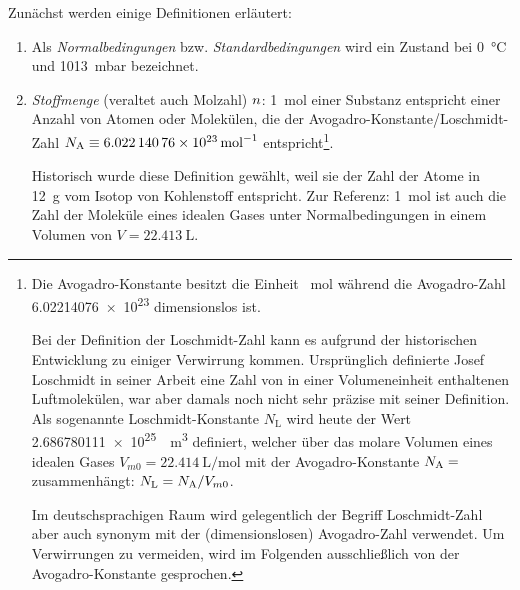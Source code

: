 Zunächst werden einige Definitionen erläutert:
\begin{enumerate}
    \item Als \emph{Normalbedingungen} bzw. \emph{Standardbedingungen} wird ein Zustand bei \SI{0}{\degreeCelsius} und \SI{1013}{\milli\bar} bezeichnet.
    \item \emph{Stoffmenge} (veraltet auch Molzahl) $n$: \SI{1}{\mole} einer Substanz entspricht einer Anzahl von Atomen oder Molekülen, die der Avogadro-Konstante/Loschmidt-Zahl $N_\mathrm{A} \equiv \SI{6,02214076e23}{\per\mole}$ entspricht\footnote{
          Die Avogadro-Konstante besitzt die Einheit \si{\per\mole} während die Avogadro-Zahl \num{6,02214076e23} dimensionslos ist.

          Bei der Definition der Loschmidt-Zahl kann es aufgrund der historischen Entwicklung zu einiger Verwirrung kommen. Ursprünglich definierte Josef Loschmidt in seiner Arbeit  eine Zahl von in einer Volumeneinheit enthaltenen Luftmolekülen, war aber damals noch nicht sehr präzise mit seiner Definition. Als sogenannte Loschmidt-Konstante $N_\mathrm{L}$ wird heute der Wert \SI{2.686780111e25}{\per\cubic\m} definiert, welcher über das molare Volumen eines idealen Gases $V_{m0} = \SI{22,414}{\liter\per\mole}$ mit der Avogadro-Konstante $N_\mathrm{A}=$ zusammenhängt: $N_\mathrm{L}=N_\mathrm{A}/V_{m0}$.\cite{lit:loschmidt_constant,lit:loschmidt}

          Im deutschsprachigen Raum wird gelegentlich der Begriff Loschmidt-Zahl aber auch synonym mit der (dimensionslosen) Avogadro-Zahl verwendet. Um Verwirrungen zu vermeiden, wird im Folgenden ausschließlich von der Avogadro-Konstante gesprochen.}.

          Historisch wurde diese Definition gewählt, weil sie der Zahl der Atome in \SI{12}{\g} vom Isotop  von Kohlenstoff entspricht.
          Zur Referenz: \SI{1}{\mole} ist auch die Zahl der Moleküle eines idealen Gases unter Normalbedingungen in einem Volumen von $V=\SI{22,413}{\liter}$.


\end{enumerate}

